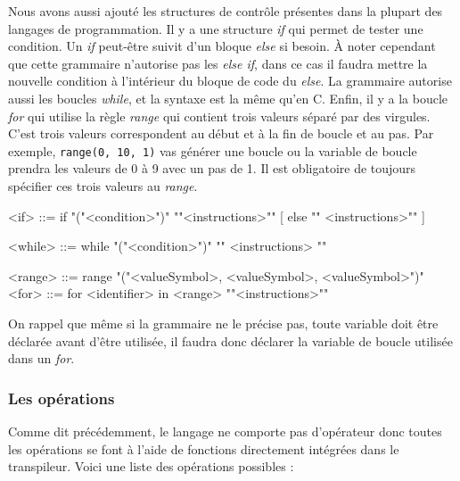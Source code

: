 \documentclass[a4paper]{article}%
\begin{document}
Nous avons aussi ajouté les structures de contrôle présentes dans la plupart des
langages de programmation. Il y a une structure \textit{if} qui permet de tester
une condition. Un \textit{if} peut-être suivit d'un bloque \textit{else} si
besoin. À noter cependant que cette grammaire n'autorise pas les \textit{else
if}, dans ce cas il faudra mettre la nouvelle condition à l'intérieur du bloque
de code du \textit{else}. La grammaire autorise aussi les boucles
\textit{while}, et la syntaxe est la même qu'en C. Enfin, il y a la boucle
\textit{for} qui utilise la règle \textit{range} qui contient trois valeurs
séparé par des virgules. C'est trois valeurs correspondent au début et à la fin
de boucle et au pas. Par exemple, \lstinline{range(0, 10, 1)} vas générer une
boucle ou la variable de boucle prendra les valeurs de 0 à 9 avec un pas de 1.
Il est obligatoire de toujours spécifier ces trois valeurs au \textit{range}.

\begin{grammar}
<if> ::= if "("<condition>")" "{"<instructions>"}" [ else "{" <instructions>"}" ]

<while> ::= while "("<condition>")" "{" <instructions> "}"

<range> ::= range "("<valueSymbol>, <valueSymbol>, <valueSymbol>")"
<for> ::= for <identifier> in <range> "{"<instructions>"}"
\end{grammar}\leavevmode\newline

On rappel que même si la grammaire ne le précise pas, toute variable doit être
déclarée avant d'être utilisée, il faudra donc déclarer la variable de boucle
utilisée dans un \textit{for}.

\subsubsection*{Les opérations}
\label{sec:operator}

Comme dit précédemment, le langage ne comporte pas d'opérateur donc toutes
les opérations se font à l'aide de fonctions directement intégrées dans le
transpileur. Voici une liste des opérations possibles :
\end{document}
